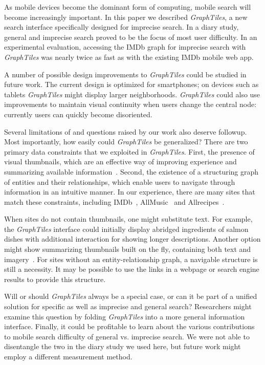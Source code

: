 As mobile devices become the dominant form of computing, mobile search will become increasingly important. In this paper we described \textit{GraphTiles}, a new search interface specifically designed for imprecise search. In a diary study, general and imprecise search proved to be the focus of most user difficulty. In an experimental evaluation, accessing the IMDb graph for imprecise search with \textit{GraphTiles} was nearly twice as fast as with the existing IMDb mobile web app.

A number of possible design improvements to \textit{GraphTiles} could be studied in future work. The current design is optimized for smartphones; on devices such as tablets \textit{GraphTiles} might display larger neighborhoods. \textit{GraphTiles} could also use improvements to maintain visual continuity when users change the central node: currently users can quickly become disoriented. 

Several limitations of and questions raised by our work also deserve followup. Most importantly, how easily could \textit{GraphTiles} be generalized?  There are two primary data constraints that we exploited in \textit{GraphTiles}. First, the presence of visual thumbnails, which are an effective way of improving experience and summarizing available information~\cite{Setlur:2011}. Second, the existence of a structuring graph of entities and their relationships, which enable users to navigate through information in an intuitive manner. In our experience, there are many sites that match these constraints, including IMDb~\cite{imdb}, AllMusic~\cite{allmusic} and Allrecipes~\cite{allrecipes}. 

When sites do not contain thumbnails, one might substitute text. For example, the \textit{GraphTiles} interface could initially display abridged ingredients of salmon dishes with additional interaction for showing longer descriptions. Another option might show summarizing thumbnails built on the fly, containing both text and imagery~\cite{Setlur:2011}. For sites without an entity-relationship graph, a navigable structure is still a necessity. It may be possible to use the links in a webpage or search engine results to provide this structure.

Will or should \textit{GraphTiles} always be a special case, or can it be part of a unified solution for specific as well as imprecise and general search? Researchers might examine this question by folding \textit{GraphTiles} into a more general information interface. Finally, it could be profitable to learn about the various contributions to mobile search difficulty of general vs. imprecise search. We were not able to disentangle the two in the diary study we used here, but future work might employ a different measurement method.
